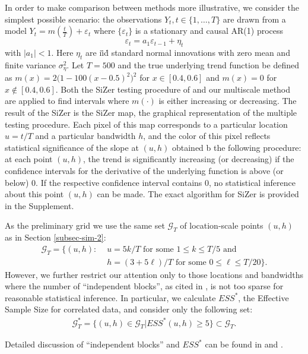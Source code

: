 \documentclass[a4paper,12pt]{article}
\begin{document}
In order to make comparison between methods more illustrative, we consider the simplest possible scenario: the observations $Y_t, t \in \{1, \ldots, T\}$ are drawn from a model $Y_t = m(\frac{t}{T}) + \varepsilon_t$ where $\{\varepsilon_t\}$ is a stationary and causal AR(1) process
\[ \varepsilon_t = a_1 \varepsilon_{t - 1} + \eta_t
\]
with $|a_1| < 1$. Here $\eta_t$ are i\.i\.d standard normal innovations with zero mean and finite variance $\sigma_\eta^2$. Let $T = 500$ and the true underlying trend function be defined as $m(x) = 2\big(1 - 100(x - 0.5)^2\big)^2$ for $x \in [0.4, 0.6]$ and $m(x) = 0$ for $x \notin [0.4, 0.6]$. Both the SiZer testing procedure of \cite{Rondonotti2007} and our multiscale method are applied to find intervals where $m(\cdot)$ is either increasing or decreasing. The result of the SiZer is the SiZer map, the graphical representation of the multiple testing procedure. Each pixel of this map corresponds to a particular location $u = t/T$ and a particular bandwidth $h$, and the color of this pixel reflects statistical significance of the slope at $(u, h)$ obtained b the following procedure: at each point $(u, h)$, the trend is significantly increasing (or decreasing) if the confidence intervals for the derivative of the underlying function is above (or below) $0$. If the respective confidence interval contains $0$, no statistical inference about this point $(u, h)$ can be made. The exact algorithm for SiZer is provided in the Supplement. 

As the preliminary grid we use the same set $\mathcal{G}_T$ of location-scale points $(u,h)$ as in Section \ref{subsec-sim-2}:
\begin{align}
\mathcal{G}_T = \big\{ (u, h): & \, \, u = 5k/T \text{ for some } 1 \le k \le T/5 \text{ and } \nonumber \\ & \, \, h = (3+5\ell)/T \text{ for some } 0 \le \ell \le T/20 \big\}.
\end{align}
However, we further restrict our attention only to those locations and bandwidths where the number of ``independent blocks'', as cited in \cite{Rondonotti2007}, is not too sparse for reasonable statistical inference. In particular, we calculate $ESS^*$, the Effective Sample Size for correlated data, and consider only the following set:
\begin{align}
\mathcal{G}_T^*  = \big\{ (u, h)\in \mathcal{G}_T| ESS^*(u, h) \geq 5\}\subset \mathcal{G}_T.
\end{align}

Detailed discussion of ``independent blocks'' and $ESS^*$ can be found in \cite{ChaudhuriMarron1999} and \cite{Rondonotti2007}.
\end{document}
